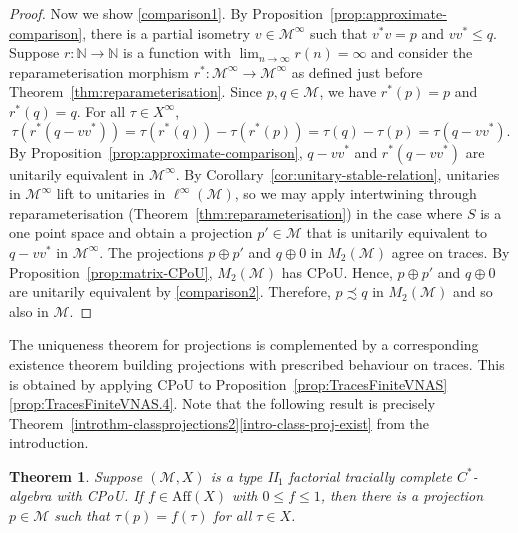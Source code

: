 \documentclass[a4paper,11pt]{amsart}
\newtheorem{theorem}{Theorem}
\theoremstyle{definition}
\numberwithin{equation}{section}
\numberwithin{theorem}{section}
\newcommand{\M}{\mathcal{M}}
\begin{document}
\begin{proof}
	Now we show \ref{comparison1}.  By Proposition~\ref{prop:approximate-comparison}, there is a partial isometry $v \in \M^\infty$ such that $v^* v = p$ and $vv^* \leq q$.  Suppose $r \colon \mathbb N \rightarrow \mathbb N$ is a function with $\lim_{n \rightarrow \infty} r(n) = \infty$ and consider the reparameterisation morphism $r^* \colon \M^\infty \rightarrow \M^\infty$ as defined just before Theorem~\ref{thm:reparameterisation}.  Since $p, q \in \M$, we have $r^*(p) = p$ and $r^*(q) = q$.  For all $\tau \in X^\infty$,
	\begin{equation}
		\tau(r^*(q - vv^*)) = \tau(r^*(q)) - \tau(r^*(p)) = \tau(q) - \tau(p) = \tau(q - vv^*).
	\end{equation}
	By Proposition~\ref{prop:approximate-comparison}, $q - vv^*$ and $r^*(q - vv^*)$ are unitarily equivalent in $\M^\infty$.  By Corollary~\ref{cor:unitary-stable-relation}, unitaries in $\M^\infty$ lift to unitaries in $\ell^\infty(\M)$, so we may apply intertwining through reparameterisation (Theorem~\ref{thm:reparameterisation}) in the case where $S$ is a one point space and obtain a projection $p' \in \M$ that is unitarily equivalent to $q-vv^*$ in $\M^\infty$. The projections $p \oplus p'$ and $q \oplus 0$ in $M_2(\M)$ agree on traces. By Proposition~\ref{prop:matrix-CPoU}, $M_2(\M)$ has CPoU. Hence, $p \oplus p'$ and $q \oplus 0$ are unitarily equivalent by \ref{comparison2}.  Therefore, $p \precsim q$ in $M_2(\M)$ and so also in $\M$.
\end{proof}

The uniqueness theorem for projections is complemented by a corresponding existence theorem building projections with prescribed behaviour on traces. This is obtained by applying CPoU to Proposition~\ref{prop:TracesFiniteVNAS}\ref{prop:TracesFiniteVNAS.4}.  Note that the following result is precisely Theorem~\ref{introthm-classprojections2}\ref{intro-class-proj-exist} from the introduction.

\begin{theorem}\label{thm:existence-projections}
	Suppose $(\M, X)$ is a type {\rm II}$_1$ factorial tracially complete $C^*$-algebra with CPoU.  If $f \in \mathrm{Aff}(X)$ with $0 \leq f \leq 1$, then there is a projection $p \in \mathcal M$ such that $\tau(p) = f(\tau)$ for all $\tau \in X$.
\end{theorem}
\end{document}
